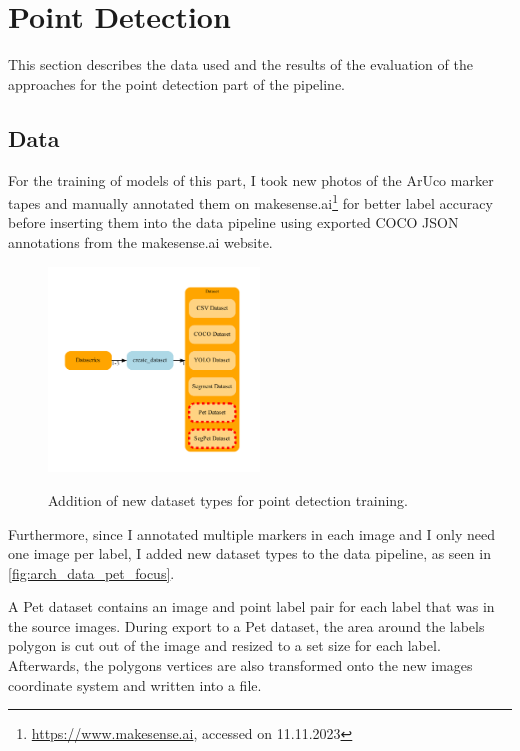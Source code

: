 \documentclass[10pt]{book}
\newcommand{\figureref}[1]{\autoref{#1}}
\begin{document}
\section{Point Detection}

This section describes the data used and the results of the evaluation of the approaches for the point detection part of the pipeline.

\subsection{Data}

For the training of models of this part, I took new photos of the \ac{ArUco} marker tapes and manually annotated them on makesense.ai\footnote{\url{https://www.makesense.ai}, accessed on 11.11.2023} for better label accuracy before inserting them into the data pipeline using exported \ac{COCO} \ac{JSON} annotations from the makesense.ai website.

\begin{figure}
  \caption{Addition of new dataset types for point detection training.}
  \includegraphics[width=0.5\textwidth]{graph/arch_data_pet_focus}
  \label{fig:arch_data_pet_focus}
\end{figure}

Furthermore, since I annotated multiple markers in each image and I only need one image per label, I added new dataset types to the data pipeline, as seen in \figureref{fig:arch_data_pet_focus}. 

A Pet dataset contains an image and point label pair for each label that was in the source images. During export to a Pet dataset, the area around the labels polygon is cut out of the image and resized to a set size for each label. Afterwards, the polygons vertices are also transformed onto the new images coordinate system and written into a file. 
\end{document}
